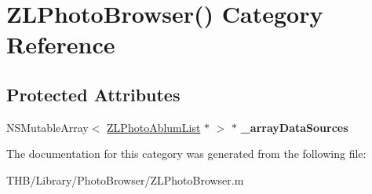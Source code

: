 \hypertarget{category_z_l_photo_browser_07_08}{}\section{Z\+L\+Photo\+Browser() Category Reference}
\label{category_z_l_photo_browser_07_08}
\subsection*{Protected Attributes}
\begin{DoxyCompactItemize}
\item 
\mbox{\label{category_z_l_photo_browser_07_08_a22ac8b923cb124509aec5117ae888b5b}} 
N\+S\+Mutable\+Array$<$ \mbox{\hyperlink{interface_z_l_photo_ablum_list}{Z\+L\+Photo\+Ablum\+List}} $\ast$ $>$ $\ast$ {\bfseries \+\_\+array\+Data\+Sources}
\end{DoxyCompactItemize}


The documentation for this category was generated from the following file\+:\begin{DoxyCompactItemize}
\item 
T\+H\+B/\+Library/\+Photo\+Browser/Z\+L\+Photo\+Browser.\+m\end{DoxyCompactItemize}
